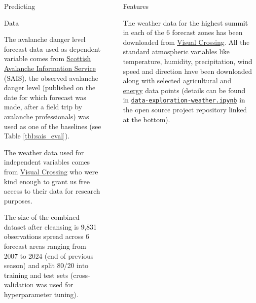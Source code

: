 \documentclass[final]{beamer}
\newlength{\sepwidth}
\newlength{\colwidth}
\newcommand{\separatorcolumn}{\begin{column}{\sepwidth}\end{column}}
\begin{document}
\begin{frame}[t]
\begin{columns}[t]
\begin{column}{\colwidth}
\begin{block}{Predicting}
\end{block}

\begin{block}{Data}


   The avalanche danger level forecast data used as dependent variable comes from \href{https://www.sais.gov.uk/forecast-archive/}{Scottish Avalanche Information Service} (SAIS), the observed avalanche danger level (published on the date for which forecast was made, after a field trip by avalanche professionals) was used as one of the baselines (see Table \ref{tbl:sais_eval}).
    
	The weather data used for independent variables comes from \href{https://www.visualcrossing.com/}{Visual Crossing} who were kind enough to grant us free access to their data for research purposes.

    The size of the combined dataset after cleansing is 9,831 observations spread across 6 forecast areas ranging from 2007 to 2024 (end of previous season) and split 80/20 into training and test sets (cross-validation was used for hyperparameter tuning).

\end{block}

\end{column}

\separatorcolumn

\begin{column}{\colwidth}

\begin{block}{Features}


    
The weather data for the highest summit in each of the 6 forecast zones has been downloaded from \href{https://www.visualcrossing.com/}{Visual Crossing}. All the standard atmospheric variables like temperature, humidity, precipitation, wind speed and direction have been downloaded along with selected \href{https://www.visualcrossing.com/resources/documentation/weather-api/agriculture-elements-in-the-timeline-weather-api/}{agricultural} and \href{https://www.visualcrossing.com/resources/documentation/weather-api/energy-elements-in-the-timeline-weather-api/}{energy} data points (details can be found in \href{https://github.com/witgaw/avalanche-danger-level-forecast/blob/project-report/src/data-exploration-weather.ipynb}{\texttt{data-exploration-weather.ipynb}} in the open source project repository linked at the bottom).


\end{block}
\end{column}
\end{columns}
\end{frame}
\end{document}
